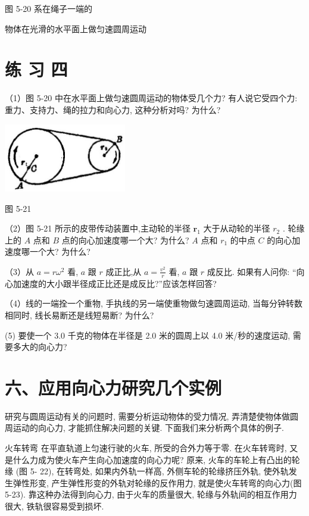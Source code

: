 \documentclass[10pt]{article}
\begin{document}
图 5-20 系在绳子一端的

物体在光滑的水平面上做匀速圆周运动

\section*{练 习 四}

（1）图 5-20 中在水平面上做匀速圆周运动的物体受几个力? 有人说它受四个力: 重力、支持力、绳的拉力和向心力, 这种分析对吗? 为什么?

\begin{center}
\includegraphics[max width=0.4\textwidth]{images/01912d55-147c-70aa-b0e0-1782a122f948_147_110938.jpg}
\end{center}

图 5-21

（2）图 5-21 所示的皮带传动装置中,主动轮的半径 \({\mathbf{r}}_{1}\) 大于从动轮的半径 \({r}_{2}\) . 轮缘上的 \(A\) 点和 \(B\) 点的向心加速度哪一个大? 为什么? \(A\) 点和 \({r}_{1}\) 的中点 \(C\) 的向心加速度哪一个大? 为什么?

（3）从 \(a = r{\omega }^{2}\) 看, \(a\) 跟 \(r\) 成正比,从 \(a = \frac{{v}^{2}}{r}\) 看, \(a\) 跟 \(r\) 成反比. 如果有人问你: “向心加速度的大小跟半径成正比还是成反比?”应该怎样回答?

（4）线的一端拴一个重物, 手执线的另一端使重物做匀速圆周运动, 当每分钟转数相同时, 线长易断还是线短易断? 为什么?

(5) 要使一个 3.0 千克的物体在半径是 2.0 米的圆周上以 4.0 米/秒的速度运动, 需要多大的向心力?

\section*{六、应用向心力研究几个实例}

研究与圆周运动有关的问题时, 需要分析运动物体的受力情况, 弄清楚使物体做圆周运动的向心力, 才能抓住解决问题的关键. 下面我们来分析两个具体的例子.

火车转弯 在平直轨道上匀速行驶的火车, 所受的合外力等于零. 在火车转弯时, 又是什么力成为使火车产生向心加速度的向心力呢? 原来, 火车的车轮上有凸出的轮缘 (图 5- 22), 在转弯处, 如果内外轨一样高, 外侧车轮的轮缘挤压外轨, 使外轨发生弹性形变, 产生弹性形变的外轨对轮缘的反作用力, 就是使火车转弯的向心力(图 5-23). 靠这种办法得到向心力, 由于火车的质量很大, 轮缘与外轨间的相互作用力很大, 铁轨很容易受到损坏.
\end{document}
